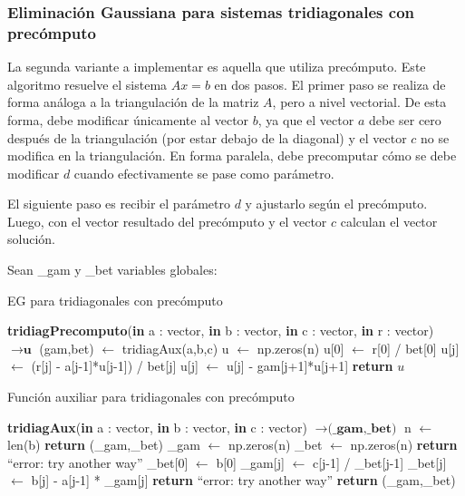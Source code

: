 \subsubsection{Eliminación Gaussiana para sistemas tridiagonales con precómputo}

La segunda variante a implementar es aquella que utiliza precómputo. Este algoritmo resuelve el sistema $Ax = b$ en dos pasos. 
El primer paso se realiza de forma análoga a la triangulación de la matriz $A$, pero a nivel vectorial. De esta forma, debe modificar únicamente al vector $b$, ya que el vector $a$ debe ser cero después de la triangulación (por estar debajo de la diagonal) y el vector $c$ no se modifica en la triangulación. En forma paralela, debe precomputar cómo se debe modificar $d$ cuando efectivamente se pase como parámetro.

El siguiente paso es recibir el parámetro $d$ y ajustarlo según el precómputo. Luego, con el vector resultado del precómputo y el vector $c$ calculan el vector solución.

Sean \_gam y \_bet variables globales:

\begin{algorithm}[H]
\caption{EG para tridiagonales con precómputo}\label{tridiagonal_prec}
\begin{algorithmic}
\State \textbf{tridiagPrecomputo}(\textbf{in} a : vector, \textbf{in} b : vector, \textbf{in} c : vector, \textbf{in} r : vector) $\to \textbf{u}$
\State (gam,bet) $\gets$ tridiagAux(a,b,c)
\State u $\gets$ np.zeros(n)
\State u[0] $\gets$ r[0] / bet[0]
    \State u[j] $\gets$ (r[j] - a[j-1]*u[j-1]) / bet[j]
\EndFor
{}
    \State u[j] $\gets$ u[j] -  gam[j+1]*u[j+1]
\EndFor
\State \textbf{return} $u$
\end{algorithmic}
\end{algorithm}

\begin{algorithm}[H]
\caption{Función auxiliar para tridiagonales con precómputo}
\begin{algorithmic}
\State \textbf{tridiagAux}(\textbf{in} a : vector, \textbf{in} b : vector, \textbf{in} c : vector) $\to \textbf{(\_gam,\_bet)}$
\State n $\gets$ len(b)
    \State \textbf{return} (\_gam,\_bet)
\EndIf
\State \_gam $\gets$ np.zeros(n)
\State \_bet $\gets$ np.zeros(n)
    \State \textbf{return} ``error: try another way''
\EndIf
\State \_bet[0] $\gets$ b[0]
    \State \_gam[j] $\gets$ c[j-1] / \_bet[j-1]
    \State \_bet[j] $\gets$ b[j] - a[j-1] * \_gam[j]
        \State \textbf{return} ``error: try another way''
    \EndIf
\EndFor
\State \textbf{return} (\_gam,\_bet)
\end{algorithmic}
\end{algorithm}

